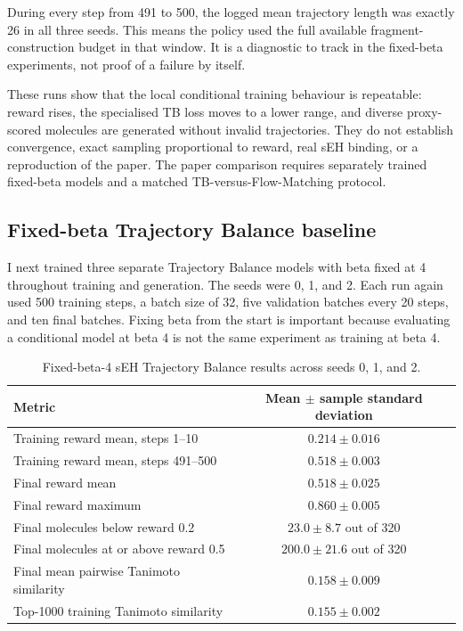 \documentclass{article}
\begin{document}
During every step from 491 to 500, the logged mean trajectory length was exactly 26 in all three seeds. This means the policy used the full available fragment-construction budget in that window. It is a diagnostic to track in the fixed-beta experiments, not proof of a failure by itself.

These runs show that the local conditional training behaviour is repeatable: reward rises, the specialised TB loss moves to a lower range, and diverse proxy-scored molecules are generated without invalid trajectories. They do not establish convergence, exact sampling proportional to reward, real sEH binding, or a reproduction of the paper. The paper comparison requires separately trained fixed-beta models and a matched TB-versus-Flow-Matching protocol.

\subsection{Fixed-beta Trajectory Balance baseline}

I next trained three separate Trajectory Balance models with beta fixed at 4 throughout training and generation. The seeds were 0, 1, and 2. Each run again used 500 training steps, a batch size of 32, five validation batches every 20 steps, and ten final batches. Fixing beta from the start is important because evaluating a conditional model at beta 4 is not the same experiment as training at beta 4.

\begin{table}[h]
\centering
\begin{tabular}{l c}
\hline
Metric & Mean $\pm$ sample standard deviation \\
\hline
Training reward mean, steps 1--10 & $0.214 \pm 0.016$ \\
Training reward mean, steps 491--500 & $0.518 \pm 0.003$ \\
Final reward mean & $0.518 \pm 0.025$ \\
Final reward maximum & $0.860 \pm 0.005$ \\
Final molecules below reward 0.2 & $23.0 \pm 8.7$ out of 320 \\
Final molecules at or above reward 0.5 & $200.0 \pm 21.6$ out of 320 \\
Final mean pairwise Tanimoto similarity & $0.158 \pm 0.009$ \\
Top-1000 training Tanimoto similarity & $0.155 \pm 0.002$ \\
\hline
\end{tabular}
\caption{Fixed-beta-4 sEH Trajectory Balance results across seeds 0, 1, and 2.}
\end{table}
\end{document}

